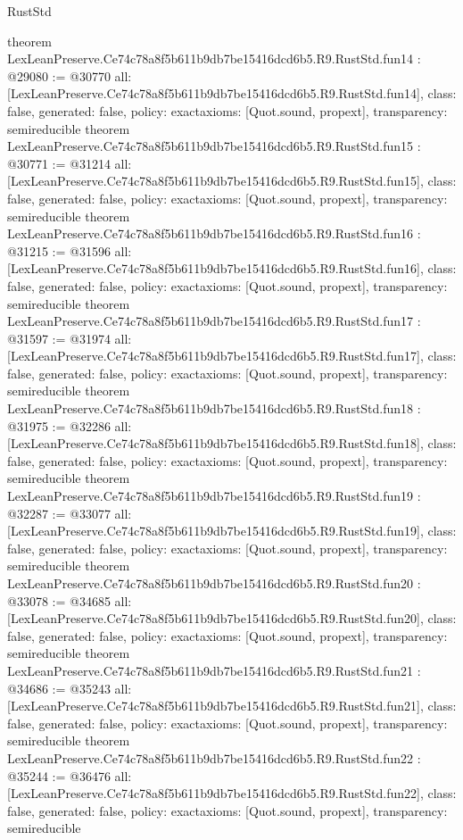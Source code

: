 \begin{lexlean}{RustStd}
\begin{coremodule}
{}
theorem LexLeanPreserve.Ce74c78a8f5b611b9db7be15416dcd6b5.R9.RustStd.fun14 : @29080 := @30770 {
  all: [LexLeanPreserve.Ce74c78a8f5b611b9db7be15416dcd6b5.R9.RustStd.fun14],
  class: false,
  generated: false,
  policy: exact{axioms: [Quot.sound, propext]},
  transparency: semireducible
}
theorem LexLeanPreserve.Ce74c78a8f5b611b9db7be15416dcd6b5.R9.RustStd.fun15 : @30771 := @31214 {
  all: [LexLeanPreserve.Ce74c78a8f5b611b9db7be15416dcd6b5.R9.RustStd.fun15],
  class: false,
  generated: false,
  policy: exact{axioms: [Quot.sound, propext]},
  transparency: semireducible
}
theorem LexLeanPreserve.Ce74c78a8f5b611b9db7be15416dcd6b5.R9.RustStd.fun16 : @31215 := @31596 {
  all: [LexLeanPreserve.Ce74c78a8f5b611b9db7be15416dcd6b5.R9.RustStd.fun16],
  class: false,
  generated: false,
  policy: exact{axioms: [Quot.sound, propext]},
  transparency: semireducible
}
theorem LexLeanPreserve.Ce74c78a8f5b611b9db7be15416dcd6b5.R9.RustStd.fun17 : @31597 := @31974 {
  all: [LexLeanPreserve.Ce74c78a8f5b611b9db7be15416dcd6b5.R9.RustStd.fun17],
  class: false,
  generated: false,
  policy: exact{axioms: [Quot.sound, propext]},
  transparency: semireducible
}
theorem LexLeanPreserve.Ce74c78a8f5b611b9db7be15416dcd6b5.R9.RustStd.fun18 : @31975 := @32286 {
  all: [LexLeanPreserve.Ce74c78a8f5b611b9db7be15416dcd6b5.R9.RustStd.fun18],
  class: false,
  generated: false,
  policy: exact{axioms: [Quot.sound, propext]},
  transparency: semireducible
}
theorem LexLeanPreserve.Ce74c78a8f5b611b9db7be15416dcd6b5.R9.RustStd.fun19 : @32287 := @33077 {
  all: [LexLeanPreserve.Ce74c78a8f5b611b9db7be15416dcd6b5.R9.RustStd.fun19],
  class: false,
  generated: false,
  policy: exact{axioms: [Quot.sound, propext]},
  transparency: semireducible
}
theorem LexLeanPreserve.Ce74c78a8f5b611b9db7be15416dcd6b5.R9.RustStd.fun20 : @33078 := @34685 {
  all: [LexLeanPreserve.Ce74c78a8f5b611b9db7be15416dcd6b5.R9.RustStd.fun20],
  class: false,
  generated: false,
  policy: exact{axioms: [Quot.sound, propext]},
  transparency: semireducible
}
theorem LexLeanPreserve.Ce74c78a8f5b611b9db7be15416dcd6b5.R9.RustStd.fun21 : @34686 := @35243 {
  all: [LexLeanPreserve.Ce74c78a8f5b611b9db7be15416dcd6b5.R9.RustStd.fun21],
  class: false,
  generated: false,
  policy: exact{axioms: [Quot.sound, propext]},
  transparency: semireducible
}
theorem LexLeanPreserve.Ce74c78a8f5b611b9db7be15416dcd6b5.R9.RustStd.fun22 : @35244 := @36476 {
  all: [LexLeanPreserve.Ce74c78a8f5b611b9db7be15416dcd6b5.R9.RustStd.fun22],
  class: false,
  generated: false,
  policy: exact{axioms: [Quot.sound, propext]},
  transparency: semireducible
}
\end{coremodule}
\end{lexlean}
